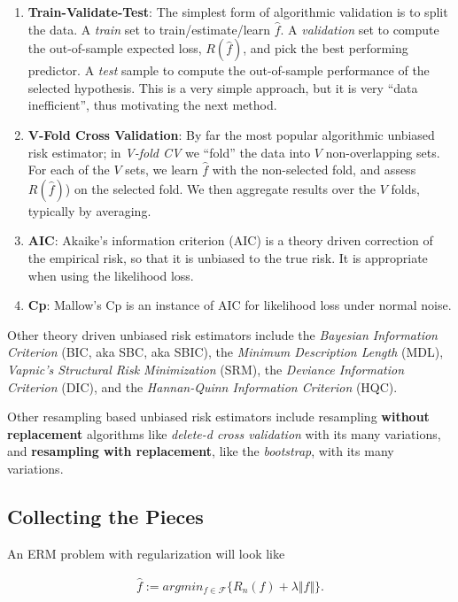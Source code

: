 \documentclass[]{book}
\theoremstyle{definition}
\theoremstyle{definition}
\theoremstyle{definition}
\theoremstyle{remark}
\begin{document}
\begin{enumerate}
\def\labelenumi{\arabic{enumi}.}
\item
  \textbf{Train-Validate-Test}: The simplest form of algorithmic
  validation is to split the data. A \emph{train} set to
  train/estimate/learn \(\hat f\). A \emph{validation} set to compute
  the out-of-sample expected loss, \(R(\hat f)\), and pick the best
  performing predictor. A \emph{test} sample to compute the
  out-of-sample performance of the selected hypothesis. This is a very
  simple approach, but it is very ``data inefficient'', thus motivating
  the next method.
\item
  \textbf{V-Fold Cross Validation}: By far the most popular algorithmic
  unbiased risk estimator; in \emph{V-fold CV} we ``fold'' the data into
  \(V\) non-overlapping sets. For each of the \(V\) sets, we learn
  \(\hat f\) with the non-selected fold, and assess \(R(\hat f)\)) on
  the selected fold. We then aggregate results over the \(V\) folds,
  typically by averaging.
\item
  \textbf{AIC}: Akaike's information criterion (AIC) is a theory driven
  correction of the empirical risk, so that it is unbiased to the true
  risk. It is appropriate when using the likelihood loss.
\item
  \textbf{Cp}: Mallow's Cp is an instance of AIC for likelihood loss
  under normal noise.
\end{enumerate}

Other theory driven unbiased risk estimators include the \emph{Bayesian
Information Criterion} (BIC, aka SBC, aka SBIC), the \emph{Minimum
Description Length} (MDL), \emph{Vapnic's Structural Risk Minimization}
(SRM), the \emph{Deviance Information Criterion} (DIC), and the
\emph{Hannan-Quinn Information Criterion} (HQC).

Other resampling based unbiased risk estimators include resampling
\textbf{without replacement} algorithms like \emph{delete-d cross
validation} with its many variations, and \textbf{resampling with
replacement}, like the \emph{bootstrap}, with its many variations.

\subsection{Collecting the Pieces}\label{collecting-the-pieces}

An ERM problem with regularization will look like

\begin{align}
  \hat f := argmin_{f \in \mathcal{F}} \{ R_n(f)  + \lambda \Vert f \Vert \}.
  \label{eq:erm-regularized}  
\end{align}
\end{document}
